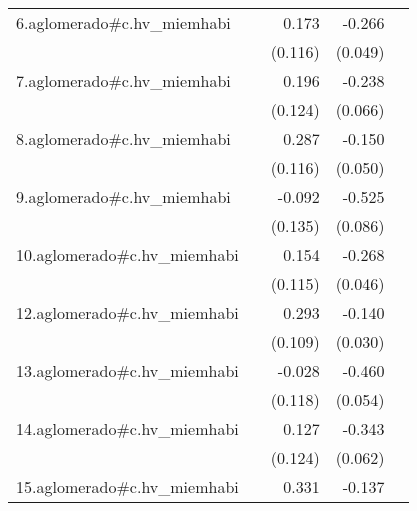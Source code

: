 {\begin{longtable}{l*{4}{D{.}{.}{-1}}}
\addlinespace
6.aglomerado#c.hv\_miemhabi&                     &       0.173         &      -0.266\sym{***}&                     \\
            &                     &     (0.116)         &     (0.049)         &                     \\
\addlinespace
7.aglomerado#c.hv\_miemhabi&                     &       0.196         &      -0.238\sym{***}&                     \\
            &                     &     (0.124)         &     (0.066)         &                     \\
\addlinespace
8.aglomerado#c.hv\_miemhabi&                     &       0.287\sym{*}  &      -0.150\sym{**} &                     \\
            &                     &     (0.116)         &     (0.050)         &                     \\
\addlinespace
9.aglomerado#c.hv\_miemhabi&                     &      -0.092         &      -0.525\sym{***}&                     \\
            &                     &     (0.135)         &     (0.086)         &                     \\
\addlinespace
10.aglomerado#c.hv\_miemhabi&                     &       0.154         &      -0.268\sym{***}&                     \\
            &                     &     (0.115)         &     (0.046)         &                     \\
\addlinespace
12.aglomerado#c.hv\_miemhabi&                     &       0.293\sym{**} &      -0.140\sym{***}&                     \\
            &                     &     (0.109)         &     (0.030)         &                     \\
\addlinespace
13.aglomerado#c.hv\_miemhabi&                     &      -0.028         &      -0.460\sym{***}&                     \\
            &                     &     (0.118)         &     (0.054)         &                     \\
\addlinespace
14.aglomerado#c.hv\_miemhabi&                     &       0.127         &      -0.343\sym{***}&                     \\
            &                     &     (0.124)         &     (0.062)         &                     \\
\addlinespace
15.aglomerado#c.hv\_miemhabi&                     &       0.331\sym{**} &      -0.137\sym{*}  &                     \\

\end{longtable}}
